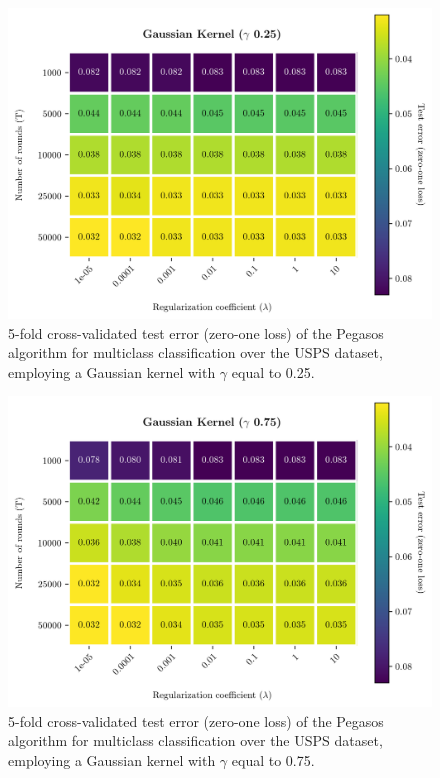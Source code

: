 \documentclass[runningheads]{llncs}
\begin{document}
\begin{figure}
  \center
  \includegraphics[width=0.8\linewidth]{../img/gaussian_25_error.png}
  \caption{5-fold cross-validated test error (zero-one loss) of the Pegasos algorithm for multiclass classification over the USPS dataset, employing a Gaussian kernel with $\gamma$ equal to 0.25.} 
  \label{fig:experiments:gaussian_25}
\end{figure}

\begin{figure}
  \center
  \includegraphics[width=0.8\linewidth]{../img/gaussian_75_error.png}
  \caption{5-fold cross-validated test error (zero-one loss) of the Pegasos algorithm for multiclass classification over the USPS dataset, employing a Gaussian kernel with $\gamma$ equal to 0.75.} 
  \label{fig:experiments:gaussian_75}
\end{figure}
\end{document}
